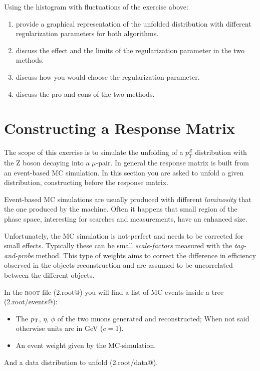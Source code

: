 \documentclass[a4paper,11pt]{article}
\begin{document}
Using the histogram with fluctuations of the exercise above:
\begin{enumerate}
	\item provide a graphical representation of the unfolded distribution with different regularization parameters for both algorithms.
	\item discuss the effect and the limits of the regularization parameter in the two methods.
	\item discuss how you would choose the regularization parameter.
	\item discuss the pro and cons of the two methods.
\end{enumerate}

\section{Constructing a Response Matrix}

The scope of this exercise is to simulate the unfolding of a $p_{T}^{Z}$ distribution with the $\mathrm{Z}$ 
boson decaying into a $\mu$-pair.
In general the response matrix is built from an event-based \gls{MC} simulation.
In this section you are asked to unfold a given distribution, constructing before the response matrix.

Event-based \gls{MC} simulations
are usually produced with different \emph{luminosity} that the one produced by the machine.
Often it happens that small region of the phase space, interesting for searches and measurements, have an enhanced size. 

Unfortunately, the \gls{MC} simulation is not-perfect and needs to be corrected for small effects.
Typically these can be small \emph{scale-factors} measured with the \emph{tag-and-probe} method. 
This type of weights aims to correct the difference in efficiency observed in the objects reconstruction
and are assumed to be uncorrelated between the different objects.

In the {\scshape root} file (\verb@Exe2.root@) you will find a list of \gls{MC} events inside a tree (\verb@Exe2.root/events@):
\begin{itemize}
	\item The $p_\textup{T}$, $\eta$, $\phi$ of the two muons generated and reconstructed; 
	      When not said otherwise units are in GeV ($c=1$).
	\item An event weight given by the \gls{MC}-simulation. 
\end{itemize}
And a data distribution to unfold (\verb@Exe2.root/data@). 
\end{document}
